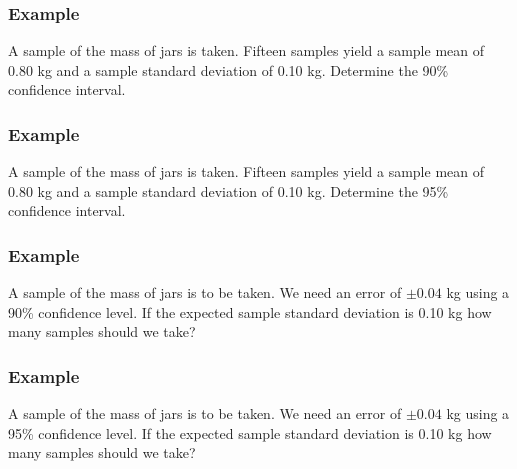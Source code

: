 \begin{frame}
  \frametitle{Example}

  A sample of the mass of jars is taken. Fifteen samples yield a
  sample mean of 0.80 kg and a sample standard deviation of 0.10
  kg. Determine the 90\% confidence interval.

  \vfill

  {
  }

  \vfill

\end{frame}

\begin{frame}
  \frametitle{Example}

  A sample of the mass of jars is taken. Fifteen samples yield a
  sample mean of 0.80 kg and a sample standard deviation of 0.10
  kg. Determine the 95\% confidence interval.

  \vfill

  {
  }

  \vfill

\end{frame}

\begin{frame}
  \frametitle{Example}

  A sample of the mass of jars is to be taken. We need an error of
  $\pm 0.04$ kg using a 90\% confidence level. If the expected sample
  standard deviation is 0.10 kg how many samples should we take?

  \vfill

  {
  }

  \vfill

\end{frame}

\begin{frame}
  \frametitle{Example}

  A sample of the mass of jars is to be taken. We need an error of
  $\pm 0.04$ kg using a 95\% confidence level. If the expected sample
  standard deviation is 0.10 kg how many samples should we take?

  \vfill

  {
  }

  \vfill

\end{frame}


